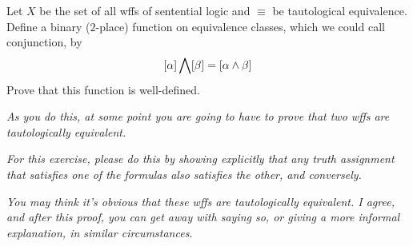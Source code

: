 \begin{problem}
  Let $X$ be the set of all wffs of sentential logic
  and $\equiv$ be tautological equivalence.
  Define a binary ($2$-place) function on equivalence classes,
  which we could call conjunction, by
  \[ [\alpha ] \bigwedge [\beta ] = [\alpha \land \beta ] \]
Prove that this function is well-defined.

\step
\emph{
  As you do this, at some point you are going to have to prove that two
  wffs are tautologically equivalent.
}
  
\step
\emph{
  For this exercise, please do this by showing
  explicitly that any truth assignment that satisfies one of the formulas also
  satisfies the other, and conversely.
}

\step
\emph{
  You may think it’s obvious that these wffs are tautologically equivalent.
  I agree, and after this proof, you can get away with saying so, or giving a
  more informal explanation, in similar circumstances.
}
\end{problem}

